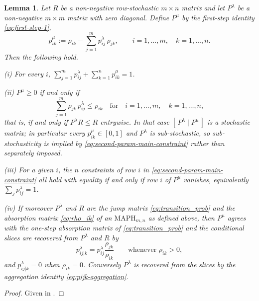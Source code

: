 \documentclass{article}
\newtheorem{lemma}{Lemma}
\newenvironment{subrevision}{}{}
\begin{document}
\begin{subrevision}
\begin{lemma}
\label{lem:feasible-jump}
Let $R$ be a non-negative row-stochastic $m \times n$ matrix and let $P^\lambda$ be a non-negative
$m \times m$ matrix with zero diagonal. Define $P^\mu$ by the first-step identity
\eqref{eq:first-step-1},
%
\[
p^\mu_{ik} := \rho_{ik} - \sum_{j=1}^m p^\lambda_{ij}\, \rho_{jk},
\qquad i=1,\ldots,m, \quad k=1,\ldots,n.
\]
%
Then the following hold.

\noindent \textup{(i)} For every $i$,
$\sum_{j=1}^m p^\lambda_{ij} + \sum_{k=1}^n p^\mu_{ik} = 1$.

\noindent \textup{(ii)} $P^\mu \ge 0$ if and only if
%
\begin{equation}
\label{eq:second-param-main-constraint}
\sum_{j=1}^m \rho_{jk}\, p^\lambda_{ij}
\le \rho_{ik}
\quad
\text{for}
\quad
i=1,\ldots,m, \quad k=1,\ldots,n,
\end{equation}
%
that is, if and only if $P^\lambda R \le R$ entrywise. In that case $[\,P^\lambda \mid P^\mu\,]$ is a
stochastic matrix; in particular every $p^\mu_{ik} \in [0,1]$ and $P^\lambda$ is sub-stochastic, so
sub-stochasticity is implied by \eqref{eq:second-param-main-constraint} rather than separately
imposed.

\noindent \textup{(iii)} For a given $i$, the $n$ constraints of row $i$ in
\eqref{eq:second-param-main-constraint} all hold with equality if and only if row $i$ of $P^\mu$
vanishes, equivalently $\sum_{j} p^\lambda_{ij} = 1$.

\noindent \textup{(iv)} If moreover $P^\lambda$ and $R$ are the jump matrix \eqref{eq:transition_prob}
and the absorption matrix \eqref{eq:rho_ik} of an $\text{MAPH}_{m,n}$ as defined above, then
$P^\mu$ agrees with the one-step absorption matrix of \eqref{eq:transition_prob} and the conditional
slices are recovered from $P^\lambda$ and $R$ by
%
\begin{equation}
\label{eq:pij-relationship-const-2-lem}
p_{ij|k}^\lambda = p^\lambda_{ij} \frac{\rho_{jk}}{\rho_{ik}}
\qquad \text{whenever } \rho_{ik}>0,
\end{equation}
%
and $p^\lambda_{ij|k}=0$ when $\rho_{ik}=0$. Conversely $P^\lambda$ is recovered from the slices by
the aggregation identity \eqref{eq:pijk-aggregation}.
\end{lemma}

\begin{proof}
Given in .
\end{proof}
\end{subrevision}
\end{document}

